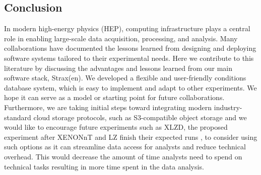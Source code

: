 \subsection{Conclusion}


In modern high-energy physics (HEP), computing infrastructure plays a central role in enabling large-scale data acquisition, processing, and analysis. Many collaborations have documented the lessons learned from designing and deploying software systems tailored to their experimental needs. Here we contribute to this literature by discussing the advantages and lessons learned from our main software stack, Strax(en). We developed a flexible and user-friendly conditions database system, which is easy to implement and adapt to other experiments. We hope it can serve as a model or starting point for future collaborations. Furthermore, we are taking initial steps toward integrating modern industry-standard cloud storage protocols, such as S3-compatible object storage and we would like to encourage future experiments such as XLZD, the proposed experiment after XENONnT and LZ finish their expected runs \cite{xenon_xlzd_announce, baudis2024darwinxlzdfuturexenonobservatory}, to consider using such options as it can streamline data access for analysts and reduce technical overhead. This would decrease the amount of time analysts need to spend on technical tasks resulting in more time spent in the data analysis.

\newpage